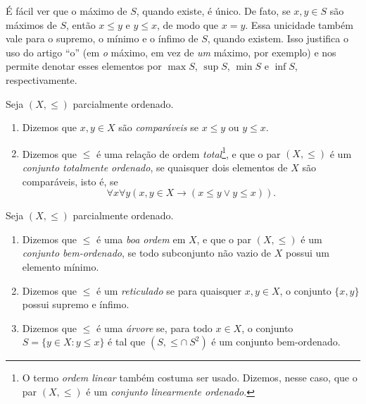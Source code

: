 \begin{remark}
    É fácil ver que o máximo de $S$, quando existe, é único. De fato, se $x, y \in S$ são máximos de $S$, então $x \leq y$ e $y \leq x$, de modo que $x = y$. Essa unicidade também vale para o supremo, o mínimo e o ínfimo de $S$, quando existem. Isso justifica o uso do artigo ``o'' (em \emph{o} máximo, em vez de \emph{um} máximo, por exemplo) e nos permite denotar esses elementos por $\max S$, $\sup S$, $\min S$ e $\inf S$, respectivamente.
\end{remark}

\begin{definition}
    Seja $(X, \leq)$ parcialmente ordenado.
        \begin{enumerate}[leftmargin=*, align=left, label=\textbf{(\alph*)}]
            \item Dizemos que $x,y \in X$ são \emph{comparáveis} se $x \leq y$ ou $y \leq x$.
            \item Dizemos que $\leq$ é uma relação de ordem \emph{total}\footnote{O termo \emph{ordem linear} também costuma ser usado. Dizemos, nesse caso, que o par $(X,\leq)$ é um \emph{conjunto linearmente ordenado}.}, e que o par $(X,\leq)$ é um \emph{conjunto totalmente ordenado}, se quaisquer dois elementos de $X$ são comparáveis, isto é, se
                \[
                    \forall x \forall y (x,y \in X \rightarrow (x \leq y \lor y \leq x)).
                \]
        \end{enumerate}
\end{definition}

\begin{definition}
    Seja $(X, \leq)$ parcialmente ordenado.
        \begin{enumerate}[leftmargin=*, align=left, label=\textbf{(\alph*)}]
            \item Dizemos que $\leq$ é uma \emph{boa ordem} em $X$, e que o par $(X,\leq)$ é um \emph{conjunto bem-ordenado}, se todo subconjunto não vazio de $X$ possui um elemento mínimo.
            \item Dizemos que $\leq$ é um \emph{reticulado} se para quaisquer $x,y \in X$, o conjunto $\{ x,y \}$ possui supremo e ínfimo.
            \item Dizemos que $\leq$ é uma \emph{árvore} se, para todo $x \in X$, o conjunto $S = \{ y \in X : y \leq x\}$ é tal que $(S, \leq \cap \ S^2)$ é um conjunto bem-ordenado.
        \end{enumerate}
\end{definition}

